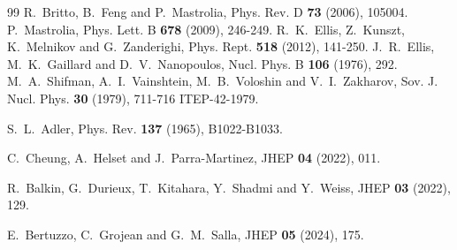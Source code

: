 \documentclass[prl,twocolumn,twoside,preprintnumbers,superscriptaddress, nofootinbib]{revtex4-2}
\begin{document}
\begin{thebibliography}{99}
%
R.~Britto, B.~Feng and P.~Mastrolia,
Phys. Rev. D \textbf{73} (2006), 105004.
%
P.~Mastrolia,
Phys. Lett. B \textbf{678} (2009), 246-249.
%
R.~K.~Ellis, Z.~Kunszt, K.~Melnikov and G.~Zanderighi,
Phys. Rept. \textbf{518} (2012), 141-250.
J.~R.~Ellis, M.~K.~Gaillard and D.~V.~Nanopoulos,
Nucl. Phys. B \textbf{106} (1976), 292.
%
M.~A.~Shifman, A.~I.~Vainshtein, M.~B.~Voloshin and V.~I.~Zakharov,
Sov. J. Nucl. Phys. \textbf{30} (1979), 711-716
ITEP-42-1979.
%

S.~L.~Adler,
Phys. Rev. \textbf{137} (1965), B1022-B1033.

C.~Cheung, A.~Helset and J.~Parra-Martinez,
JHEP \textbf{04} (2022), 011.

R.~Balkin, G.~Durieux, T.~Kitahara, Y.~Shadmi and Y.~Weiss,
JHEP \textbf{03} (2022), 129.

E.~Bertuzzo, C.~Grojean and G.~M.~Salla,
JHEP \textbf{05} (2024), 175.


\end{thebibliography}
\end{document}
